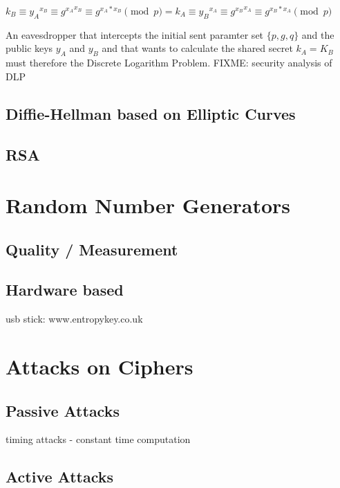 $k_B \equiv {y_A}^{x_B} \equiv {g^{x_A}}^{x_B} \equiv g^{x_A*x_B} \pmod p = k_A \equiv {y_B}^{x_A} \equiv g{^{x_B}}^{x_A} \equiv g^{x_B*x_A} \pmod p $

An eavesdropper that intercepts the initial sent paramter set $\{p, g, q\}$ and the public keys $y_A$ and $y_B$ and that wants to calculate the shared secret
$k_A = K_B$  must therefore the Discrete Logarithm Problem. FIXME: security analysis of DLP

\subsection{Diffie-Hellman based on Elliptic Curves}

\subsection{RSA}

\section{Random Number Generators}

\subsection{Quality / Measurement}

\subsection{Hardware based}

usb stick: 
www.entropykey.co.uk


\section{Attacks on Ciphers}

\subsection{Passive Attacks}

timing attacks - constant time computation

\subsection{Active Attacks}
